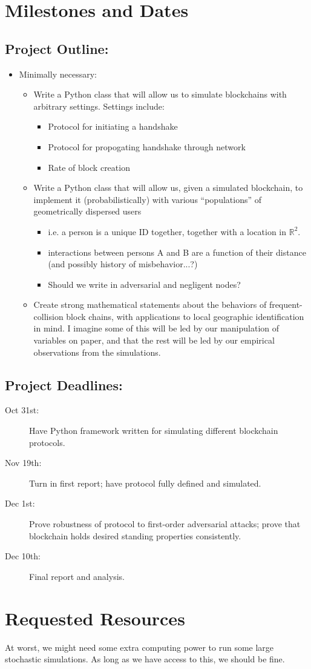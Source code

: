 \documentclass{article}
\begin{document}
\section*{Milestones and Dates}
\subsection*{Project Outline:}
\begin{itemize}
	\item Minimally necessary:
	\begin{itemize}
		\item Write a Python class that will allow us to simulate
			blockchains with arbitrary settings. Settings include:
		\begin{itemize}
			\item Protocol for initiating a handshake
			\item Protocol for propogating handshake through network
			\item Rate of block creation
		\end{itemize}
		\item Write a Python class that will allow us, given a simulated
			blockchain, to implement it (probabilistically) with
			various ``populations'' of geometrically dispersed users
		\begin{itemize}
			\item i.e. a person is a unique ID together,
				together with a location in $\mathbb{R}^2$.
			\item interactions between persons A and B are
				a function of their distance (and possibly
				history of misbehavior...?)
			\item Should we write in adversarial and negligent nodes?
		\end{itemize}
		\item Create strong mathematical statements about
			the behaviors of frequent-collision block chains,
			with applications to local geographic identification
			in mind. I imagine some of this will be led by our
			manipulation of variables on paper,
			and that the rest will be led by our empirical
			observations from the simulations.
	\end{itemize}
\end{itemize}

\subsection*{Project Deadlines:}
\begin{description}
	\item[Oct 31st:] Have Python framework written for simulating different
		blockchain protocols.
	\item[Nov 19th:] Turn in first report; have protocol fully defined and
		simulated.
	\item[Dec 1st:] Prove robustness of protocol to first-order adversarial
		attacks; prove that blockchain holds desired standing properties
		consistently.
	\item[Dec 10th:] Final report and analysis.
\end{description}

\section*{Requested Resources}
At worst, we might need some extra computing power to run some large stochastic
simulations. As long as we have access to this, we should be fine.
\end{document}
